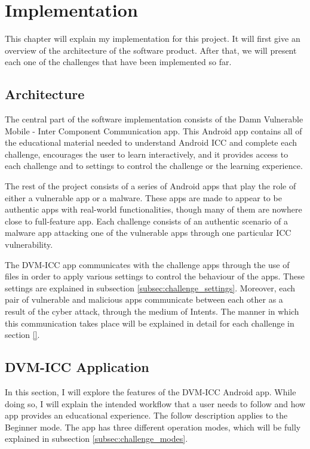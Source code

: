 \chapter{Implementation}
    \label{chap:implementation}

   This chapter will explain my implementation for this project. It will first give an overview of the architecture of the software product. After that, we will present each one of the challenges that have been implemented so far.

    \section{Architecture} 
        \label{sec:architecture}
        
    The central part of the software implementation consists of the Damn Vulnerable Mobile - Inter Component Communication app. This Android app contains all of the educational material needed to understand Android ICC and complete each challenge, encourages the user to learn interactively,  and it provides access to each challenge and to settings to control the challenge or the learning experience. 
    
    The rest of the project consists of a series of Android apps that play the role of either a vulnerable app or a malware. These apps are made to appear to be authentic apps with real-world functionalities, though many of them are nowhere close to full-feature app. Each challenge consists of an authentic scenario of a malware app attacking one of the vulnerable apps through one particular ICC vulnerability.
    
    The DVM-ICC app communicates with the challenge apps through the use of files in order to apply various settings to control the behaviour of the apps. These settings are explained in subsection \ref{subsec:challenge_settings}. Moreover, each pair of vulnerable and malicious apps communicate between each other as a result of the cyber attack, through the medium of Intents. The manner in which this communication takes place will be explained in detail for each challenge in section \ref{}.
    
    \section{DVM-ICC Application}
        \label{sec:home_app}
        
    In this section, I will explore the features of the DVM-ICC Android app. While doing so, I will explain the intended workflow that a user needs to follow and how app provides an educational experience. The follow description applies to the Beginner mode. The app has three different operation modes, which will be fully explained in subsection \ref{subsec:challenge_modes}.
    
